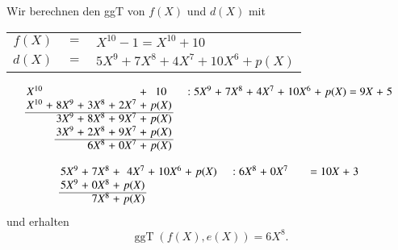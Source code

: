 Wir berechnen den ggT von $f(X)$ und $d(X)$ mit
\begin{center}
\begin{tabular}{r c l}
	$f(X)$ & $=$ & $X^{10} - 1 = X^{10} + 10$ \\
	$d(X)$ & $=$ & $5X^9 + 7X^8 + 4X^7 + 10X^6 + p(X)$
\end{tabular}
\end{center} 
%
%
%
%
%
\[
\arraycolsep=1.4pt
\begin{array}{rcrcrcrcccrcrcrcrcrcrcrcrcr}
	X^{10}& & & & & & &+& 10& & & & &:&5X^9&+&7X^8&+& 4X^7&+&10X^6&+&p(X)&=&9X&+&5\\
	X^{10}&+& 8X^9&+& 3X^8&+&2X^7&+& p(X)& &  & & & &   & & & & & &   & &  & & \\ \cline{1-9}
	&& 3X^9&+& 8X^8&+& 9X^7&+& p(X)& &   & & & & & &   & &  & & \\
	&& 3X^9&+& 2X^8&+& 9X^7&+& p(X)& &   & & & & & &   & &  & & \\ \cline{3-9}
	& &    & &6X^8&+&0X^7&+&p(X)& &   & & & & & &   & &  & & \\
\end{array}
\]

\[
\arraycolsep=1.4pt
\begin{array}{rcrcrcrcccrcrcrcrcrcrcrcrcr}
	5X^9&+& 7X^8&+& 4X^7&+& 10X^6&+& p(X)& & & & &:&6X^8&+&0X^7& & & & & & &=&10X&+&3\\
	5X^9&+& 0X^8&+& p(X)& & & & & &  & & & &   & & & & & &   & &  & & \\ \cline{1-5}
	&& 7X^8&+& p(X)& & & & & &   & & & & & &   & &  & & \\
\end{array}
\]
und erhalten
\[
\operatorname{ggT}(f(X),e(X)) = 6X^8.
\]

